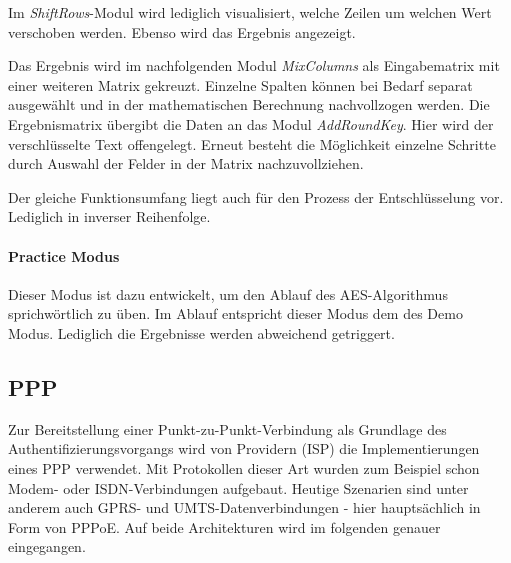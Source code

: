    Im \textit{ShiftRows}-Modul wird lediglich visualisiert, welche Zeilen um welchen Wert verschoben
   werden. Ebenso wird das Ergebnis angezeigt.

   Das Ergebnis wird im nachfolgenden Modul \textit{MixColumns} als Eingabematrix mit einer weiteren
   Matrix gekreuzt. Einzelne Spalten können bei Bedarf separat ausgewählt und in der
   mathematischen Berechnung nachvollzogen werden. Die Ergebnismatrix übergibt die Daten
   an das Modul \textit{AddRoundKey}.
   Hier wird der verschlüsselte Text offengelegt. Erneut besteht die Möglichkeit einzelne Schritte
   durch Auswahl der Felder in der Matrix nachzuvollziehen.

   Der gleiche Funktionsumfang liegt auch für den Prozess der Entschlüsselung vor. Lediglich in
   inverser Reihenfolge\cite{michiganuni}.

   \paragraph{Practice Modus}
   Dieser Modus ist dazu entwickelt, um den Ablauf des AES-Algorithmus sprichwörtlich zu üben.
   Im Ablauf entspricht dieser Modus dem des Demo Modus. Lediglich die Ergebnisse werden
   abweichend getriggert.



\subsection{PPP}
Zur Bereitstellung einer Punkt-zu-Punkt-Verbindung als Grundlage des Authentifizierungsvorgangs
wird von Providern (\ac{ISP}) die Implementierungen eines
\ac{PPP} verwendet. Mit Protokollen dieser Art wurden zum Beispiel schon Modem- oder ISDN-Verbindungen
aufgebaut. Heutige Szenarien sind unter anderem auch GPRS- und UMTS-Datenverbindungen -
hier hauptsächlich in
Form von \ac{PPPoE}. Auf beide Architekturen wird im folgenden
genauer eingegangen.

